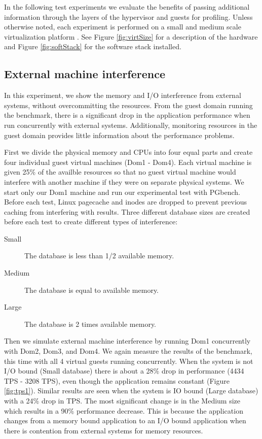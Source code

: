 In the following test experiments we evaluate the benefits of passing additional information through the layers of the hypervisor and guests for profiling.  Unless otherwise noted, each experiment is performed on a small and medium scale virtualization platform . See Figure \ref{fig:virtSize} for a description of the hardware and Figure \ref{fig:softStack} for the software stack installed.

\subsection{External machine interference}
In this experiment, we show the memory and I/O interference from external systems, without overcommitting the resources.  From the guest domain running the benchmark, there is a significant drop in the application performance when run concurrently with external systems.  Additionally, monitoring resources in the guest domain provides little information about the performance problems. 

First we divide the physical memory and CPUs into four equal parts and create four individual guest virtual machines (Dom1 - Dom4).  Each virtual machine is given 25\% of the availble resources so that no guest virtual machine would interfere with another machine if they were on separate physical systems.  We start only our Dom1 machine and run our experimental test with PGbench.  Before each test, Linux pagecache and inodes are dropped to prevent previous caching from interfering with results.  Three different database sizes are created before each test to create different types of interference:

\begin{description}
  \item[Small] The database is less than 1/2 available memory.
  \item[Medium] The database is equal to available memory.
  \item[Large] The database is 2 times available memory.
\end{description}

Then we simulate external machine interference by running Dom1 concurrently with Dom2, Dom3, and Dom4.  We again measure the results of the benchmark, this time with all 4 virtual guests running concurrently.  When the system is not I/O bound (Small database) there is about a 28\% drop in performance (4434 TPS - 3208 TPS), even though the application remains constant (Figure \ref{fig:tps1}).
Similar results are seen when the system is IO bound (Large database) with a 24\% drop in TPS.  The most significant change is in the Medium size which results in a 90\% performance decrease.  This is because the application changes from a memory bound application to an I/O bound application when there is contention from external systems for memory resources.  

